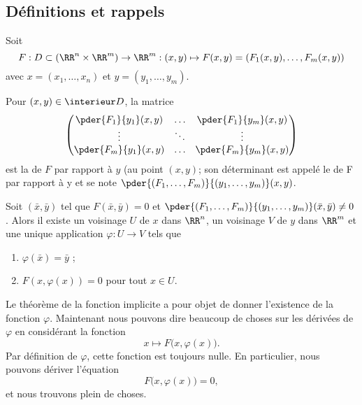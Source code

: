 \subsection{Définitions et rappels}
Soit
\begin{equation*}
  F : D \subset (\RR^n \times \RR^m) \to \RR^m : (x,y) \mapsto F(x,y) =
  (F_1(x,y),\ldots,F_m(x,y))
\end{equation*}
avec $x = (x_1,\ldots, x_n)$ et $y = (y_1,\ldots,y_m)$.

Pour $(x,y) \in \interieur D$, la matrice
\begin{equation*}
\begin{pmatrix}
\pder {F_1}{y_1}(x,y)& \ldots& \pder {F_1}{y_m}(x,y)\\
\vdots& \ddots & \vdots\\
\pder {F_m}{y_1}(x,y)& \ldots& \pder {F_m}{y_m}(x,y)\\
\end{pmatrix}
\end{equation*}
est la  de $F$ par rapport à $y$ (au point
$(x,y)$; son déterminant est appelé le  de F par
    rapport à y et se note
  $\pder{(F_1,\ldots,F_m)}{(y_1,\ldots,y_m)}(x,y)$.


\begin{theorem}
	Soit $(\bar x,\bar y)$ tel que $F(\bar x,\bar y) = 0$ et
  $\pder{(F_1,\ldots,F_m)}{(y_1,\ldots,y_m)}(\bar x,\bar y) \neq
  0$. Alors il existe un voisinage $U$ de $x$ dans $\RR^n$, un
  voisinage $V$ de $y$ dans $\RR^m$ et une unique application $\varphi
  : U \to V$ tels que
  \begin{enumerate}
  \item $\varphi(\bar x) = \bar y$ ; 
  \item $F(x,\varphi(x)) = 0$ pour tout $x \in U$.
  \end{enumerate}
\end{theorem}
	
Le théorème de la fonction implicite a pour objet de donner l'existence de la fonction $\varphi$. Maintenant nous pouvons dire beaucoup de choses sur les dérivées de $\varphi$ en considérant la fonction
\begin{equation}
	x\mapsto F\big( x,\varphi(x) \big).
\end{equation}
Par définition de $\varphi$, cette fonction est toujours nulle. En particulier, nous pouvons dériver l'équation
\begin{equation}
	F\big( x,\varphi(x) \big)=0,
\end{equation}
et nous trouvons plein de choses.


